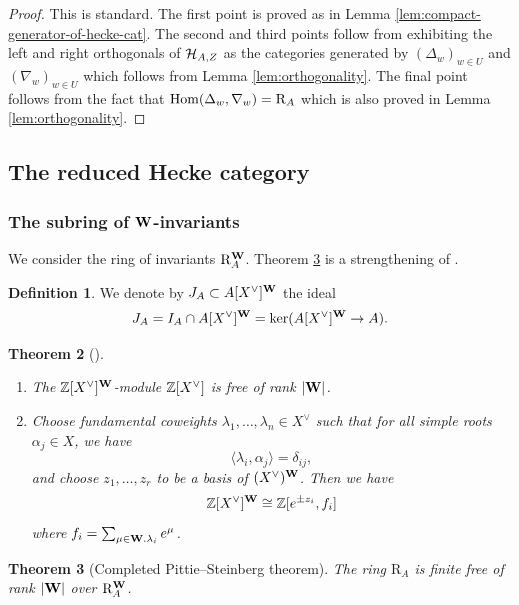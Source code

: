 \documentclass[a4paper, 10pt, oneside, reqno]{amsart}
\theoremstyle{plain}
\newtheorem{thm}{Theorem}[subsection]
\theoremstyle{definition}
\newtheorem{defi}[thm]{Definition}
\theoremstyle{remark}
\newcommand{\RR}{\mathrm{R}}
\begin{document}
\begin{proof}
This is standard. The first point is proved as in Lemma \ref{lem:compact-generator-of-hecke-cat}. The second and third points follow from exhibiting the left and right orthogonals of $\mathcal{H}_{A,Z}$ as the categories generated by $(\Delta_w)_{w\in U}$ and $(\nabla_w)_{w\in U}$ which follows from Lemma \ref{lem:orthogonality}. The final point follows from the fact that $\Hom(\Delta_w, \nabla_w) = \RR_A$ which is also proved in Lemma \ref{lem:orthogonality}. 
\end{proof}

\subsection{The reduced Hecke category}

\subsubsection{The subring of $\mathbf{W}$-invariants}
We consider the ring of invariants $\RR_{A}^{\Wbf}$. Theorem \ref{thm:completed-pittie-steinberg} is a strengthening of \cite[Theorem 8.1]{BezrukavnikovRiche}.

\begin{defi}
We denote by $J_A \subset A[X^{\vee}]^{\mathbf{W}}$ the ideal
$$J_A = I_A \cap A[X^{\vee}]^{\mathbf{W}} = \ker(A[X^{\vee}]^{\mathbf{W}} \to A).$$ 
\end{defi}

\begin{thm}[\cite{PittieSteinberg}]\label{thm:not-completed-pittie-steinberg}
\begin{enumerate}
\item The $\mathbb{Z}[X^{\vee}]^{\mathbf{W}}$-module $\mathbb{Z}[X^{\vee}]$ is free of rank $|\mathbf{W}|$.
\item Choose fundamental coweights $\lambda_1, \dots, \lambda_n \in X^{\vee}$ such that for all simple roots $\alpha_j \in X$, we have 
$$\langle \lambda_i, \alpha_j \rangle = \delta_{ij},$$
and choose $z_1, \dots, z_r$ to be a basis of $(X^{\vee})^{\mathbf{W}}$. Then we have 
$$\mathbb{Z}[X^{\vee}]^{\mathbf{W}} \cong \mathbb{Z}[e^{\pm z_i}, f_i]$$
where $f_i = \sum_{\mu \in \mathbf{W}.\lambda_i} e^{\mu}$.
\end{enumerate}
\end{thm}

\begin{thm}[Completed Pittie--Steinberg theorem]\label{thm:completed-pittie-steinberg}
The ring $\RR_{A}$ is finite free of rank $|\mathbf{W}|$ over $\RR_{A}^{\Wbf}$.
\end{thm}
\end{document}
